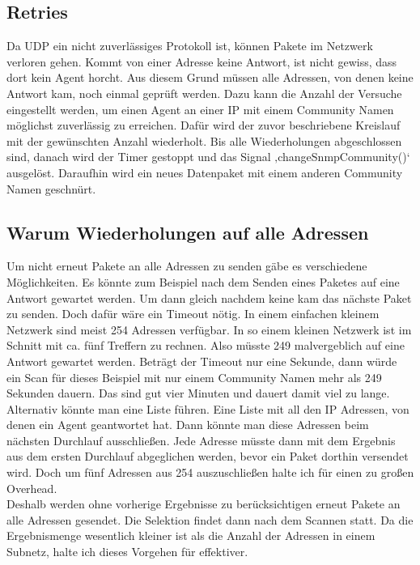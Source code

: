 \documentclass[11pt,a4paper]{article}
\begin{document}
\subsection{Retries}
Da UDP ein nicht zuverlässiges Protokoll ist, können Pakete im Netzwerk verloren gehen. Kommt von einer Adresse keine Antwort, ist nicht gewiss, dass dort kein Agent horcht. Aus diesem Grund müssen alle Adressen, von denen keine Antwort kam, noch einmal geprüft werden. Dazu kann die Anzahl der Versuche eingestellt werden, um einen Agent an einer IP mit einem Community Namen möglichst zuverlässig zu erreichen. Dafür wird der zuvor beschriebene Kreislauf mit der gewünschten Anzahl wiederholt. Bis alle Wiederholungen abgeschlossen sind, danach wird der Timer gestoppt und das Signal ‚changeSnmpCommunity()‘ ausgelöst. Daraufhin wird ein neues Datenpaket mit einem anderen Community Namen geschnürt.\\

\subsection{Warum Wiederholungen auf alle Adressen}
Um nicht erneut Pakete an alle Adressen zu senden gäbe es verschiedene Möglichkeiten. Es könnte zum Beispiel nach dem Senden eines Paketes auf eine Antwort gewartet werden. Um dann gleich nachdem keine kam das nächste Paket zu senden. Doch dafür wäre ein Timeout nötig. In einem einfachen kleinem Netzwerk sind meist 254 Adressen verfügbar. In so einem kleinen Netzwerk ist im Schnitt mit ca. fünf Treffern zu rechnen. Also müsste 249 malvergeblich auf eine Antwort gewartet werden. Beträgt der Timeout nur eine Sekunde, dann würde ein Scan für dieses Beispiel mit nur einem Community Namen mehr als 249 Sekunden dauern. Das sind gut vier Minuten und dauert damit viel zu lange.\\
Alternativ könnte man eine Liste führen. Eine Liste mit all den IP Adressen, von denen ein Agent geantwortet hat. Dann könnte man diese Adressen beim nächsten Durchlauf ausschließen. Jede Adresse müsste dann mit dem Ergebnis aus dem ersten Durchlauf abgeglichen werden, bevor ein Paket dorthin versendet wird. Doch um fünf Adressen aus 254 auszuschließen halte ich für einen zu großen Overhead.\\
Deshalb werden ohne vorherige Ergebnisse zu berücksichtigen erneut Pakete an alle Adressen gesendet. Die Selektion findet dann nach dem Scannen statt. Da die Ergebnismenge wesentlich kleiner ist als die Anzahl der Adressen in einem Subnetz, halte ich dieses Vorgehen für effektiver.\\
\end{document}
